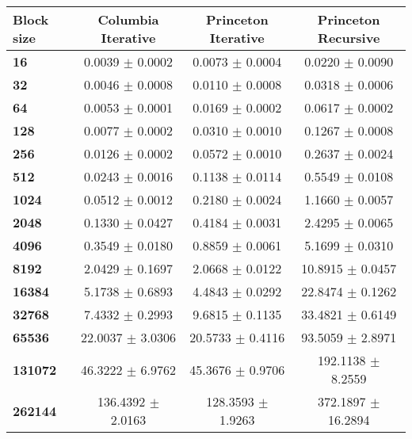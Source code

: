 \begin{tabular}{lccc}\toprule
\textbf{Block size}  & \textbf{Columbia Iterative} & \textbf{Princeton Iterative} & \textbf{Princeton Recursive} \\\midrule
\textbf{16}     & 0.0039 $\pm$ 0.0002 & 0.0073 $\pm$ 0.0004 & 0.0220 $\pm$ 0.0090        \\
\textbf{32}     & 0.0046 $\pm$ 0.0008 & 0.0110 $\pm$ 0.0008 & 0.0318 $\pm$ 0.0006        \\
\textbf{64}     & 0.0053 $\pm$ 0.0001 & 0.0169 $\pm$ 0.0002 & 0.0617 $\pm$ 0.0002        \\
\textbf{128}    & 0.0077 $\pm$ 0.0002 & 0.0310 $\pm$ 0.0010 & 0.1267 $\pm$ 0.0008        \\
\textbf{256}    & 0.0126 $\pm$ 0.0002 & 0.0572 $\pm$ 0.0010 & 0.2637 $\pm$ 0.0024        \\
\textbf{512}    & 0.0243 $\pm$ 0.0016 & 0.1138 $\pm$ 0.0114 & 0.5549 $\pm$ 0.0108        \\
\textbf{1024}   & 0.0512 $\pm$ 0.0012 & 0.2180 $\pm$ 0.0024 & 1.1660 $\pm$ 0.0057        \\
\textbf{2048}   & 0.1330 $\pm$ 0.0427 & 0.4184 $\pm$ 0.0031 & 2.4295 $\pm$ 0.0065        \\
\textbf{4096}   & 0.3549 $\pm$ 0.0180 & 0.8859 $\pm$ 0.0061 & 5.1699 $\pm$ 0.0310        \\
\textbf{8192}   & 2.0429 $\pm$ 0.1697 & 2.0668 $\pm$ 0.0122 & 10.8915 $\pm$ 0.0457       \\
\textbf{16384}  & 5.1738 $\pm$ 0.6893 & 4.4843 $\pm$ 0.0292 & 22.8474 $\pm$ 0.1262       \\
\textbf{32768}  & 7.4332 $\pm$ 0.2993 & 9.6815 $\pm$ 0.1135 & 33.4821 $\pm$ 0.6149       \\
\textbf{65536}  & 22.0037 $\pm$ 3.0306 & 20.5733 $\pm$ 0.4116 & 93.5059 $\pm$ 2.8971     \\
\textbf{131072} & 46.3222 $\pm$ 6.9762 & 45.3676 $\pm$ 0.9706 & 192.1138 $\pm$ 8.2559    \\
\textbf{262144} & 136.4392 $\pm$ 2.0163 & 128.3593 $\pm$ 1.9263 & 372.1897 $\pm$ 16.2894 \\
\bottomrule
\end{tabular}
